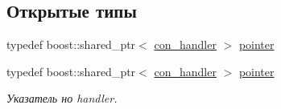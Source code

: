 \subsection*{Открытые типы}
\begin{DoxyCompactItemize}
\item 
typedef boost\+::shared\+\_\+ptr$<$ \mbox{\hyperlink{classcon__handler}{con\+\_\+handler}} $>$ \mbox{\hyperlink{classcon__handler_ada4a1b970f9fd8e55460a58cf7f7ce2c}{pointer}}
\item 
typedef boost\+::shared\+\_\+ptr$<$ \mbox{\hyperlink{classcon__handler}{con\+\_\+handler}} $>$ \mbox{\hyperlink{classcon__handler_ada4a1b970f9fd8e55460a58cf7f7ce2c}{pointer}}
\begin{DoxyCompactList}\small\item\em Указатель но handler. \end{DoxyCompactList}\end{DoxyCompactItemize}

